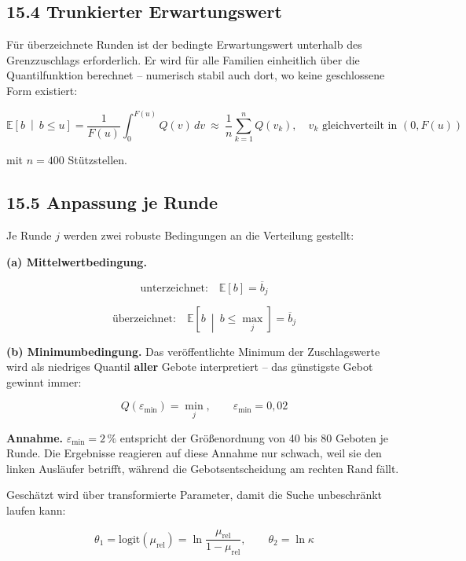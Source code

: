 \documentclass[
  a4paper,
  10pt]{article}
\renewenvironment{quote}
  {\begin{tcolorbox}[
      enhanced,
      breakable,
      colback=Wash,
      colframe=Brand,
      boxrule=0pt,
      leftrule=2.2pt,
      arc=0pt,
      left=8pt,right=8pt,top=6pt,bottom=6pt,
      before skip=8pt,after skip=9pt
    ]\small\color{InkSoft}}
  {\end{tcolorbox}}
\begin{document}
\hypertarget{trunkierter-erwartungswert}{%
\subsection{15.4 Trunkierter
Erwartungswert}\label{trunkierter-erwartungswert}}

Für überzeichnete Runden ist der bedingte Erwartungswert unterhalb des
Grenzzuschlags erforderlich. Er wird für alle Familien einheitlich über
die Quantilfunktion berechnet -- numerisch stabil auch dort, wo keine
geschlossene Form existiert:

\[ \mathbb{E}\left[b \ \middle|\ b \leq u\right] = \frac{1}{F(u)} \int_{0}^{F(u)} Q(v)\, dv \ \approx\ \frac{1}{n}\sum_{k=1}^{n} Q(v_k), \quad v_k \text{ gleichverteilt in } (0, F(u)) \]

mit \(n = 400\) Stützstellen.

\hypertarget{anpassung-je-runde}{%
\subsection{15.5 Anpassung je Runde}\label{anpassung-je-runde}}

Je Runde \(j\) werden zwei robuste Bedingungen an die Verteilung
gestellt:

\textbf{(a) Mittelwertbedingung.}

\[ \text{unterzeichnet:} \quad \mathbb{E}[b] = \overline{b}_j \]

\[ \text{überzeichnet:} \quad \mathbb{E}\left[b \ \middle|\ b \leq \max_j\right] = \overline{b}_j \]

\textbf{(b) Minimumbedingung.} Das veröffentlichte Minimum der
Zuschlagswerte wird als niedriges Quantil \textbf{aller} Gebote
interpretiert -- das günstigste Gebot gewinnt immer:

\[ Q(\varepsilon_{\min}) = \min_j, \qquad \varepsilon_{\min} = 0{,}02 \]

\begin{quote}
\textbf{Annahme.} \(\varepsilon_{\min} = 2\,\%\) entspricht der
Größenordnung von 40 bis 80 Geboten je Runde. Die Ergebnisse reagieren
auf diese Annahme nur schwach, weil sie den linken Ausläufer betrifft,
während die Gebotsentscheidung am rechten Rand fällt.
\end{quote}

Geschätzt wird über transformierte Parameter, damit die Suche
unbeschränkt laufen kann:

\[ \theta_1 = \mathrm{logit}\left(\mu_{\mathrm{rel}}\right) = \ln\frac{\mu_{\mathrm{rel}}}{1-\mu_{\mathrm{rel}}}, \qquad \theta_2 = \ln \kappa \]
\end{document}
